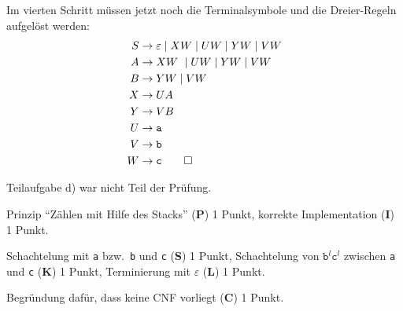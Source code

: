 \begin{loesung}
\begin{teilaufgaben}
Im vierten Schritt müssen jetzt noch die Terminalsymbole und die 
Dreier-Regeln aufgelöst werden:
\begin{align*}
S&\rightarrow \varepsilon \mid  XW \mid  UW \mid  YW \mid  VW \\
A&\rightarrow X W \mid  UW \mid  YW \mid  VW \\
B&\rightarrow YW \mid  VW \\
X&\rightarrow UA \\
Y&\rightarrow VB \\
U&\rightarrow \texttt{a} \\
V&\rightarrow \texttt{b} \\
W&\rightarrow \texttt{c}
\qedhere
\end{align*}
\end{teilaufgaben}
\end{loesung}

\begin{diskussion}
Teilaufgabe d) war nicht Teil der Prüfung.
\end{diskussion}

\begin{bewertung}
\begin{teilaufgaben}
\item Prinzip ``Zählen mit Hilfe des Stacks'' ({\bf P}) 1 Punkt,
korrekte Implementation ({\bf I}) 1 Punkt.
\item 
Schachtelung mit \texttt{a} bzw.~\texttt{b} und \texttt{c} ({\bf S}) 1 Punkt,
Schachtelung von $\texttt{b}^l\texttt{c}^l$ zwischen \texttt{a} und \texttt{c}
({\bf K}) 1 Punkt,
Terminierung mit $\varepsilon$ ({\bf L}) 1 Punkt.
\item
Begründung dafür, dass keine CNF vorliegt ({\bf C}) 1 Punkt.
\end{teilaufgaben}
\end{bewertung}
